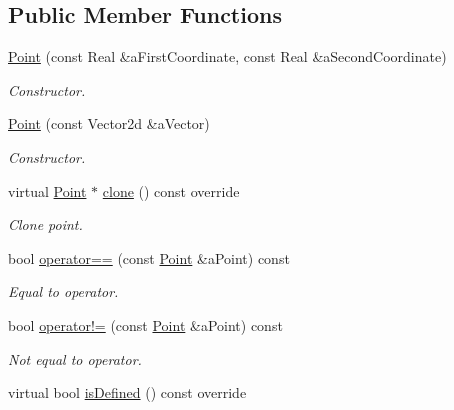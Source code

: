 \subsection*{Public Member Functions}
\begin{DoxyCompactItemize}
\item 
\hyperlink{classlibrary_1_1math_1_1geom_1_1d2_1_1objects_1_1_point_a4998aefdf80bdfd967f21d49fa050398}{Point} (const Real \&a\+First\+Coordinate, const Real \&a\+Second\+Coordinate)
\begin{DoxyCompactList}\small\item\em Constructor. \end{DoxyCompactList}\item 
\hyperlink{classlibrary_1_1math_1_1geom_1_1d2_1_1objects_1_1_point_af936e1d3646217e0e75b3100f937303c}{Point} (const Vector2d \&a\+Vector)
\begin{DoxyCompactList}\small\item\em Constructor. \end{DoxyCompactList}\item 
virtual \hyperlink{classlibrary_1_1math_1_1geom_1_1d2_1_1objects_1_1_point}{Point} $\ast$ \hyperlink{classlibrary_1_1math_1_1geom_1_1d2_1_1objects_1_1_point_aa6b55bdbf5a0ce9ec8bc91ca79de3569}{clone} () const override
\begin{DoxyCompactList}\small\item\em Clone point. \end{DoxyCompactList}\item 
bool \hyperlink{classlibrary_1_1math_1_1geom_1_1d2_1_1objects_1_1_point_af5223d8e73deaf75ac248a5d43139628}{operator==} (const \hyperlink{classlibrary_1_1math_1_1geom_1_1d2_1_1objects_1_1_point}{Point} \&a\+Point) const
\begin{DoxyCompactList}\small\item\em Equal to operator. \end{DoxyCompactList}\item 
bool \hyperlink{classlibrary_1_1math_1_1geom_1_1d2_1_1objects_1_1_point_ac3a7bf1647172166e83a016ca32669c3}{operator!=} (const \hyperlink{classlibrary_1_1math_1_1geom_1_1d2_1_1objects_1_1_point}{Point} \&a\+Point) const
\begin{DoxyCompactList}\small\item\em Not equal to operator. \end{DoxyCompactList}\item 
virtual bool \hyperlink{classlibrary_1_1math_1_1geom_1_1d2_1_1objects_1_1_point_ac90251968d8eb11df82e28f6cf095e5c}{is\+Defined} () const override

\end{DoxyCompactItemize}
